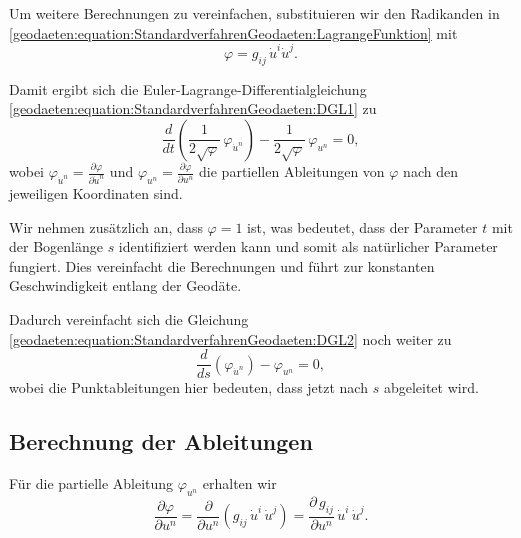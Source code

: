 Um weitere Berechnungen zu vereinfachen, substituieren wir den Radikanden in \eqref{geodaeten:equation:StandardverfahrenGeodaeten:LagrangeFunktion} mit
\begin{equation}
	\varphi = g_{ij} \, \dot{u}^i \dot{u}^j.
	\label{geodaeten:equation:StandardverfahrenGeodaeten:Substitution}
\end{equation}

Damit ergibt sich die Euler-Lagrange-Differentialgleichung \eqref{geodaeten:equation:StandardverfahrenGeodaeten:DGL1} zu
\begin{equation}
	\frac{d}{dt} \left(\frac{1}{2 \sqrt{\varphi}} \, \varphi_{\dot{u}^n}\right) - \frac{1}{2 \sqrt{\varphi}} \, \varphi_{u^n} = 0,
	\label{geodaeten:equation:StandardverfahrenGeodaeten:DGL2}
\end{equation}
wobei $\varphi_{\dot{u}^n} = \frac{\partial \varphi}{\partial \dot{u}^n}$ und $\varphi_{u^n} = \frac{\partial \varphi}{\partial u^n}$ die partiellen Ableitungen von $\varphi$ nach den jeweiligen Koordinaten sind.

Wir nehmen zusätzlich an, dass $\varphi = 1$ ist, was bedeutet, dass der Parameter $t$ mit der Bogenlänge $s$ identifiziert werden kann und somit als natürlicher Parameter fungiert.
Dies vereinfacht die Berechnungen und führt zur konstanten Geschwindigkeit entlang der Geodäte.

Dadurch vereinfacht sich die Gleichung \eqref{geodaeten:equation:StandardverfahrenGeodaeten:DGL2} noch weiter zu
\begin{equation}
	\frac{d}{ds} \left( \varphi_{\dot{u}^n} \right) - \varphi_{u^n} = 0,
	\label{geodaeten:equation:StandardverfahrenGeodaeten:DGL3}
\end{equation}
wobei die Punktableitungen hier bedeuten, dass jetzt nach $s$ abgeleitet wird.

\subsection{Berechnung der Ableitungen}
Für die partielle Ableitung $\varphi_{u^n}$ erhalten wir
\begin{equation} 
	\frac{\partial \varphi}{\partial u^n} = \frac{\partial}{\partial u^n} \left(g_{ij} \, \dot{u}^i \, \dot{u}^j\right) = \frac{\partial \, g_{ij}}{\partial u^n} \, \dot{u}^i \, \dot{u}^j. 
	\label{geodaeten:equation:StandardverfahrenGeodaeten:PartialPhi1}
\end{equation}

